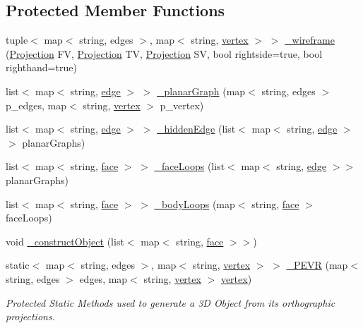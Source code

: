 \subsection*{Protected Member Functions}
\begin{DoxyCompactItemize}
\item 
tuple$<$ map$<$ string, edges $>$, map$<$ string, \mbox{\hyperlink{structvertex}{vertex}} $>$ $>$ \mbox{\hyperlink{class_object3_d_aab82aa55f1c1a0f30d3f0f00caaecd7e}{\+\_\+wireframe}} (\mbox{\hyperlink{class_projection}{Projection}} FV, \mbox{\hyperlink{class_projection}{Projection}} TV, \mbox{\hyperlink{class_projection}{Projection}} SV, bool rightside=true, bool righthand=true)
\item 
list$<$ map$<$ string, \mbox{\hyperlink{structedge}{edge}} $>$ $>$ \mbox{\hyperlink{class_object3_d_a4ba10d710ee36ae12a341adfda9b9631}{\+\_\+planar\+Graph}} (map$<$ string, edges $>$ p\+\_\+edges, map$<$ string, \mbox{\hyperlink{structvertex}{vertex}} $>$ p\+\_\+vertex)
\item 
list$<$ map$<$ string, \mbox{\hyperlink{structedge}{edge}} $>$ $>$ \mbox{\hyperlink{class_object3_d_ab9e9d4a2b40223c7f4edaec90e99bf79}{\+\_\+hidden\+Edge}} (list$<$ map$<$ string, \mbox{\hyperlink{structedge}{edge}} $>$$>$ planar\+Graphs)
\item 
list$<$ map$<$ string, \mbox{\hyperlink{structface}{face}} $>$ $>$ \mbox{\hyperlink{class_object3_d_ad6a51c52f7e5109270b7097ab2ca6397}{\+\_\+face\+Loops}} (list$<$ map$<$ string, \mbox{\hyperlink{structedge}{edge}} $>$$>$ planar\+Graphs)
\item 
list$<$ map$<$ string, \mbox{\hyperlink{structface}{face}} $>$ $>$ \mbox{\hyperlink{class_object3_d_ae5af4d44db97eead74f41baca0e9aa89}{\+\_\+body\+Loops}} (map$<$ string, \mbox{\hyperlink{structface}{face}} $>$ face\+Loops)
\item 
void \mbox{\hyperlink{class_object3_d_a53eb59ed67548b9c941aa2607989c680}{\+\_\+construct\+Object}} (list$<$ map$<$ string, \mbox{\hyperlink{structface}{face}} $>$$>$)
\item 
static$<$ map$<$ string, edges $>$, map$<$ string, \mbox{\hyperlink{structvertex}{vertex}} $>$ $>$ \mbox{\hyperlink{class_object3_d_acc47b9e290622539909a31f75b491961}{\+\_\+\+P\+E\+VR}} (map$<$ string, edges $>$ edges, map$<$ string, \mbox{\hyperlink{structvertex}{vertex}} $>$ \mbox{\hyperlink{structvertex}{vertex}})
\begin{DoxyCompactList}\small\item\em Protected Static Methods used to generate a 3D Object from its orthographic projections. \end{DoxyCompactList}\item 
$$
\end{DoxyCompactItemize}

